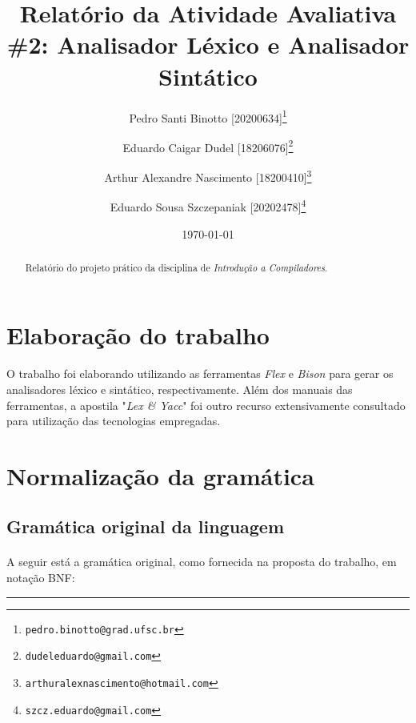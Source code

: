 \documentclass[12pt]{article}
\title{Relatório da Atividade Avaliativa \#2: Analisador Léxico e Analisador Sintático}
\author[1]{Pedro Santi Binotto [20200634]\thanks{\texttt{pedro.binotto@grad.ufsc.br}}}
\author[2]{Eduardo Caigar Dudel [18206076]\thanks{\texttt{dudeleduardo@gmail.com}}}
\author[3]{Arthur Alexandre Nascimento [18200410]\thanks{\texttt{arthuralexnascimento@hotmail.com}}}
\author[4]{Eduardo Sousa Szczepaniak [20202478]\thanks{\texttt{szcz.eduardo@gmail.com}}}
\date{\today}
\affil[1]{Departamento de Informática e Estatística, Universidade Federal de Santa Catarina}
\begin{document}
\begin{titlepage}
\maketitle
\thispagestyle{empty}

\begin{abstract}
  Relatório do projeto prático da disciplina de \textit{Introdução a Compiladores}.
\end{abstract}

\end{titlepage}

\newpage
\tableofcontents

\newpage
\section{Elaboração do trabalho}
\paragraph{}
O trabalho foi elaborando utilizando as ferramentas \textit{Flex}\cite{mitFlex1990} e \textit{Bison}\cite{mitBison1992}
para gerar os analisadores léxico e sintático, respectivamente. Além dos manuais das ferramentas, a apostila
"\textit{Lex \& Yacc}"\cite{niemannYacc} foi outro recurso extensivamente consultado para utilização das tecnologias
empregadas.

\paragraph{}


\newpage
\section{Normalização da gramática}
\subsection{Gramática original da linguagem}

\paragraph{}
A seguir está a gramática original, como fornecida na proposta do trabalho, em notação BNF:

\noindent\rule{\textwidth}{0.2pt}
\end{document}
